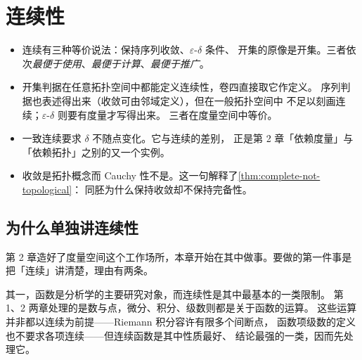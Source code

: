 \chapter{连续性}
\label{ch:continuity}

\begin{keypoint}[本章要点]
  \begin{itemize}
    \item 连续有三种等价说法：保持序列收敛、\(\varepsilon\)-\(\delta\) 条件、
          开集的原像是开集。三者依次\emph{最便于使用}、\emph{最便于计算}、\emph{最便于推广}。
    \item 开集判据在任意拓扑空间中都能定义连续性，卷四直接取它作定义。
          序列判据也表述得出来（收敛可由邻域定义），但在一般拓扑空间中
          不足以刻画连续；\(\varepsilon\)-\(\delta\) 则要有度量才写得出来。
          三者在度量空间中等价。
    \item 一致连续要求 \(\delta\) 不随点变化。它与连续的差别，
          正是第 2 章「依赖度量」与「依赖拓扑」之别的又一个实例。
    \item 收敛是拓扑概念而 Cauchy 性不是。这一句解释了\cref{thm:complete-not-topological}：
          同胚为什么保持收敛却不保持完备性。
  \end{itemize}
\end{keypoint}

\section{为什么单独讲连续性}
\label{sec:why-continuity}

第 2 章造好了度量空间这个工作场所，本章开始在其中做事。要做的第一件事是
把「连续」讲清楚，理由有两条。

其一，函数是分析学的主要研究对象，而连续性是其中最基本的一类限制。
第 1、2 两章处理的是数与点，微分、积分、级数则都是关于函数的运算。
这些运算并非都以连续为前提——Riemann 积分容许有限多个间断点，
函数项级数的定义也不要求各项连续——但连续函数是其中性质最好、
结论最强的一类，因而先处理它。


